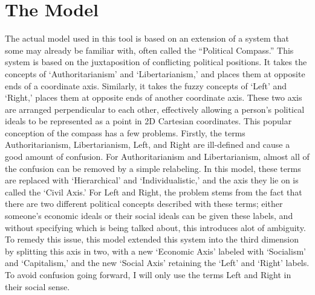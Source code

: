 \documentclass[12pt]{article}
\begin{document}
\section{The Model}
\qquad The actual model used in this tool is based on an extension of a system that some may already be familiar with, often called the ``Political Compass.'' This system is based on the juxtaposition of conflicting political positions. It takes the concepts of `Authoritarianism' and `Libertarianism,' and places them at opposite ends of a coordinate axis. Similarly, it takes the fuzzy concepts of `Left' and `Right,' places them at opposite ends of another coordinate axis. These two axis are arranged perpendicular to each other, effectively allowing a person's political ideals to be represented as a point in 2D Cartesian coordinates. This popular conception of the compass has a few problems. Firstly, the terms Authoritarianism, Libertarianism, Left, and Right are ill-defined and cause a good amount of confusion. For Authoritarianism and Libertarianism, almost all of the confusion can be removed by a simple relabeling. In this model, these terms are replaced with `Hierarchical' and `Individualistic,' and the axis they lie on is called the `Civil Axis.' For Left and Right, the problem stems from the fact that there are two different political concepts described with these terms; either someone's economic ideals or their social ideals can be given these labels, and without specifying which is being talked about, this introduces alot of ambiguity. To remedy this issue, this model extended this system into the third dimension by splitting this axis in two, with a new `Economic Axis' labeled with `Socialism' and `Capitalism,' and the new `Social Axis' retaining the `Left' and `Right' labels. To avoid confusion going forward, I will only use the terms Left and Right in their social sense. \\
\end{document}
